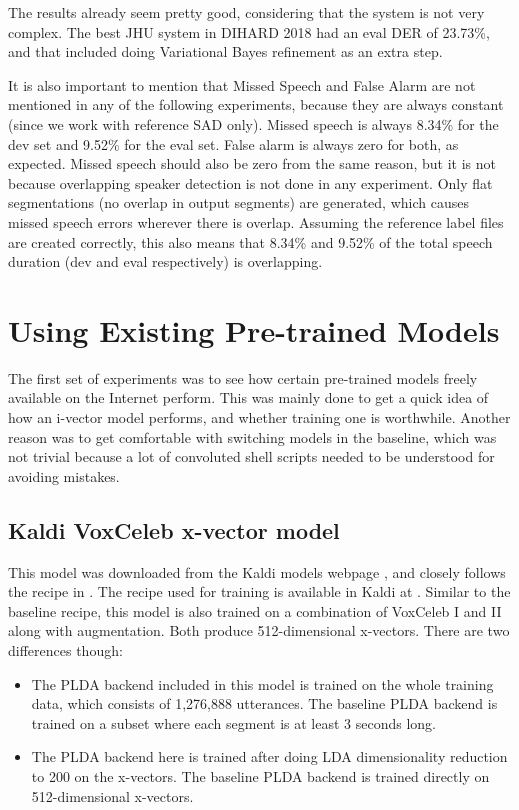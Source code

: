 	The results already seem pretty good, considering that the system is not very complex. The best JHU system in DIHARD 2018 had an eval DER of 23.73\%, and that included doing Variational Bayes refinement \cite{sell2015diarization} as an extra step.

	It is also important to mention that Missed Speech and False Alarm are not mentioned in any of the following experiments, because they are always constant (since we work with reference SAD only). Missed speech is always 8.34\% for the dev set and 9.52\% for the eval set. False alarm is always zero for both, as expected. Missed speech should also be zero from the same reason, but it is not because overlapping speaker detection is not done in any experiment. Only flat segmentations (no overlap in output segments) are generated, which causes missed speech errors wherever there is overlap. Assuming the reference label files are created correctly, this also means that 8.34\% and 9.52\% of the total speech duration (dev and eval respectively) is overlapping.
	
	\section{Using Existing Pre-trained Models}
	The first set of experiments was to see how certain pre-trained models freely available on the Internet perform. This was mainly done to get a quick idea of how an i-vector model performs, and whether training one is worthwhile. Another reason was to get comfortable with switching models in the baseline, which was not trivial because a lot of convoluted shell scripts needed to be understood for avoiding mistakes.
	
		\subsection{Kaldi VoxCeleb x-vector model}
			This model was downloaded from the Kaldi models webpage \cite{kaldi_models_webpage}, and closely follows the recipe in \cite{snyder2018x}. The recipe used for training is available in Kaldi at . Similar to the baseline recipe, this model is also trained on a combination of VoxCeleb I and II along with augmentation. Both produce 512-dimensional x-vectors. There are two differences though:
			\begin{itemize}
				\item The PLDA backend included in this model is trained on the whole training data, which consists of 1,276,888 utterances. The baseline PLDA backend is trained on a subset where each segment is at least 3 seconds long.
				\item The PLDA backend here is trained after doing LDA dimensionality reduction to 200 on the x-vectors. The baseline PLDA backend is trained directly on 512-dimensional x-vectors.
			\end{itemize}
			
